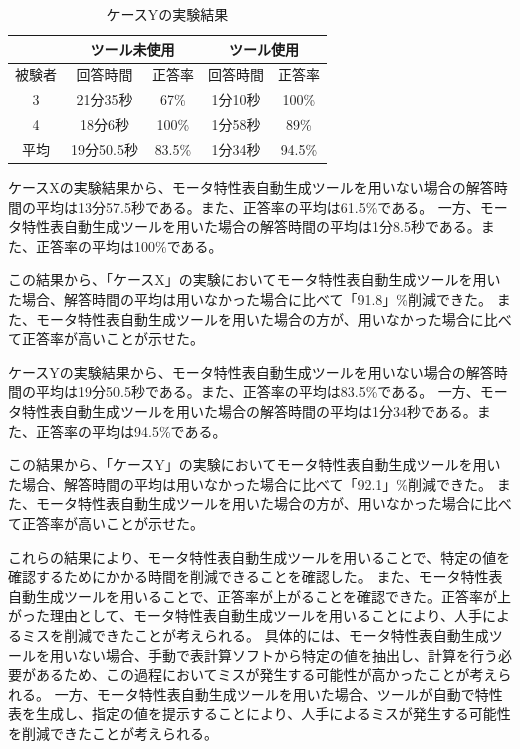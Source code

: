\begin{table}[tp]
  \begin{center}
    \caption{ケースYの実験結果}
    \label{resultY}
    \begin{tabular}{c|c|c|c|c|}
    \cline{2-5}
                              & \multicolumn{2}{c|}{ツール未使用} & \multicolumn{2}{c|}{ツール使用} \\ \hline
    \multicolumn{1}{|c||}{被験者} & 回答時間           & 正答率          & 回答時間           & 正答率         \\ \hline\hline
    \multicolumn{1}{|c||}{3}   & 21分35秒           & 67\%         & 1分10秒           & 100\%         \\ \hline
    \multicolumn{1}{|c||}{4}   & 18分6秒          & 100\%          & 1分58秒          & 89\%         \\ \hline\hline
    \multicolumn{1}{|c||}{平均}   & 19分50.5秒          & 83.5\%          & 1分34秒          & 94.5\%         \\ \hline
    \end{tabular}
  \end{center}
\end{table}

ケースXの実験結果から、モータ特性表自動生成ツールを用いない場合の解答時間の平均は13分57.5秒である。また、正答率の平均は61.5\%である。
一方、モータ特性表自動生成ツールを用いた場合の解答時間の平均は1分8.5秒である。また、正答率の平均は100\%である。

この結果から、「ケースX」の実験においてモータ特性表自動生成ツールを用いた場合、解答時間の平均は用いなかった場合に比べて「91.8」\%削減できた。
また、モータ特性表自動生成ツールを用いた場合の方が、用いなかった場合に比べて正答率が高いことが示せた。

ケースYの実験結果から、モータ特性表自動生成ツールを用いない場合の解答時間の平均は19分50.5秒である。また、正答率の平均は83.5\%である。
一方、モータ特性表自動生成ツールを用いた場合の解答時間の平均は1分34秒である。また、正答率の平均は94.5\%である。

この結果から、「ケースY」の実験においてモータ特性表自動生成ツールを用いた場合、解答時間の平均は用いなかった場合に比べて「92.1」\%削減できた。
また、モータ特性表自動生成ツールを用いた場合の方が、用いなかった場合に比べて正答率が高いことが示せた。


これらの結果により、モータ特性表自動生成ツールを用いることで、特定の値を確認するためにかかる時間を削減できることを確認した。
また、モータ特性表自動生成ツールを用いることで、正答率が上がることを確認できた。正答率が上がった理由として、モータ特性表自動生成ツールを用いることにより、人手によるミスを削減できたことが考えられる。
具体的には、モータ特性表自動生成ツールを用いない場合、手動で表計算ソフトから特定の値を抽出し、計算を行う必要があるため、この過程においてミスが発生する可能性が高かったことが考えられる。
一方、モータ特性表自動生成ツールを用いた場合、ツールが自動で特性表を生成し、指定の値を提示することにより、人手によるミスが発生する可能性を削減できたことが考えられる。

